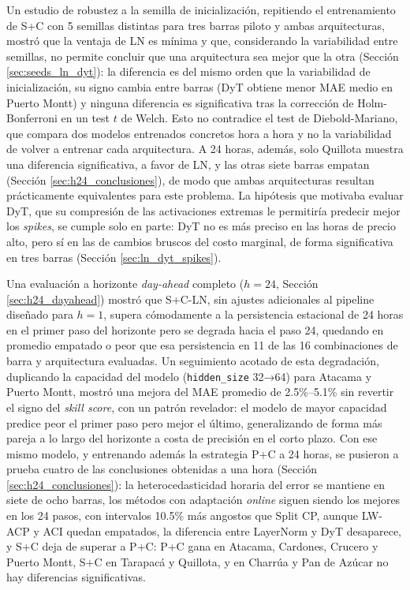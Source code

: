 Un estudio de robustez a la semilla de inicialización, repitiendo el entrenamiento de S+C con 5 semillas distintas para tres barras piloto y ambas arquitecturas, mostró que la ventaja de LN es mínima y que, considerando la variabilidad entre semillas, no permite concluir que una arquitectura sea mejor que la otra (Sección \ref{sec:seeds_ln_dyt}): la diferencia es del mismo orden que la variabilidad de inicialización, su signo cambia entre barras (DyT obtiene menor MAE medio en Puerto Montt) y ninguna diferencia es significativa tras la corrección de Holm-Bonferroni en un test $t$ de Welch. Esto no contradice el test de Diebold-Mariano, que compara dos modelos entrenados concretos hora a hora y no la variabilidad de volver a entrenar cada arquitectura. A 24 horas, además, solo Quillota muestra una diferencia significativa, a favor de LN, y las otras siete barras empatan (Sección \ref{sec:h24_conclusiones}), de modo que ambas arquitecturas resultan prácticamente equivalentes para este problema. La hipótesis que motivaba evaluar DyT, que su compresión de las activaciones extremas le permitiría predecir mejor los \textit{spikes}, se cumple solo en parte: DyT no es más preciso en las horas de precio alto, pero sí en las de cambios bruscos del costo marginal, de forma significativa en tres barras (Sección \ref{sec:ln_dyt_spikes}).

Una evaluación a horizonte \textit{day-ahead} completo ($h=24$, Sección \ref{sec:h24_dayahead}) mostró que S+C-LN, sin ajustes adicionales al pipeline diseñado para $h=1$, supera cómodamente a la persistencia estacional de 24 horas en el primer paso del horizonte pero se degrada hacia el paso 24, quedando en promedio empatado o peor que esa persistencia en 11 de las 16 combinaciones de barra y arquitectura evaluadas. Un seguimiento acotado de esta degradación, duplicando la capacidad del modelo (\texttt{hidden\_size} 32→64) para Atacama y Puerto Montt, mostró una mejora del MAE promedio de 2.5\%--5.1\% sin revertir el signo del \textit{skill score}, con un patrón revelador: el modelo de mayor capacidad predice peor el primer paso pero mejor el último, generalizando de forma más pareja a lo largo del horizonte a costa de precisión en el corto plazo. Con ese mismo modelo, y entrenando además la estrategia P+C a 24 horas, se pusieron a prueba cuatro de las conclusiones obtenidas a una hora (Sección \ref{sec:h24_conclusiones}): la heterocedasticidad horaria del error se mantiene en siete de ocho barras, los métodos con adaptación \textit{online} siguen siendo los mejores en los 24 pasos, con intervalos 10.5\% más angostos que Split CP, aunque LW-ACP y ACI quedan empatados, la diferencia entre LayerNorm y DyT desaparece, y S+C deja de superar a P+C: P+C gana en Atacama, Cardones, Crucero y Puerto Montt, S+C en Tarapacá y Quillota, y en Charrúa y Pan de Azúcar no hay diferencias significativas.

